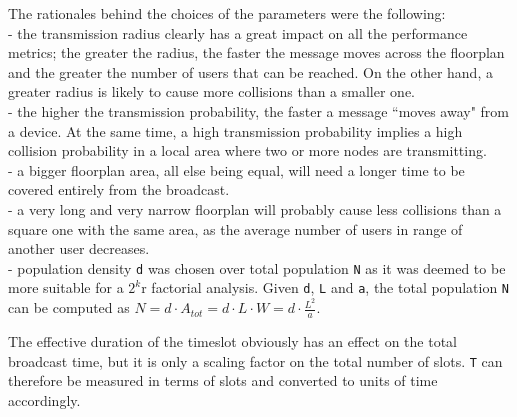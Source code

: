 The rationales behind the choices of the parameters were the following:\\
 - the transmission radius clearly has a great impact on all the performance metrics; the greater the radius, the faster the message moves across the floorplan and the greater the number of users that can be reached. On the other hand, a greater radius is likely to cause more collisions than a smaller one.\\
- the higher the transmission probability, the faster a message ``moves away" from a device. At the same time, a high transmission probability implies a high collision probability in a local area where two or more nodes are transmitting.\\
- a bigger floorplan area, all else being equal, will need a longer time to be covered entirely from the broadcast.\\
- a very long and very narrow floorplan will probably cause less collisions than a square one with the same area, as the average number of users in range of another user decreases.\\
- population density \texttt{d} was chosen over total population \texttt{N} as it was deemed to be more suitable for a $2^{k}$r factorial analysis.
Given \texttt{d}, \texttt{L} and \texttt{a}, the total population \texttt{N} can be computed as $N=d \cdot A_{tot} = d \cdot L \cdot W = d \cdot \frac{L^{2}}{a}$.

The effective duration of the timeslot obviously has an effect on the total broadcast time, but it is only a scaling factor on the total number of slots. \texttt{T} can therefore be measured in terms of slots and converted to units of time accordingly.